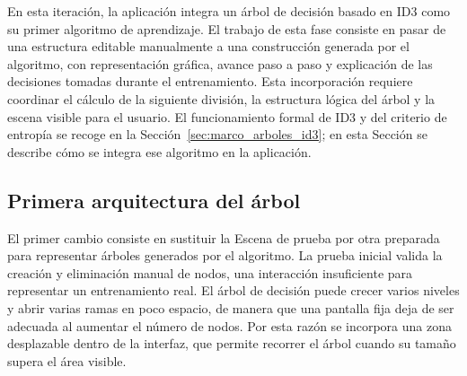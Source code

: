 En esta iteración, la aplicación integra un árbol de decisión basado en ID3 como su primer algoritmo de aprendizaje.
El trabajo de esta fase consiste en pasar de una estructura editable manualmente a una construcción generada por el algoritmo, con representación gráfica, avance paso a paso y explicación de las decisiones tomadas durante el entrenamiento.
Esta incorporación requiere coordinar el cálculo de la siguiente división, la estructura lógica del árbol y la \gls{escena} visible para el usuario.
El funcionamiento formal de ID3 y del criterio de entropía se recoge en la Sección~\ref{sec:marco_arboles_id3}; en esta Sección se describe cómo se integra ese algoritmo en la aplicación.


\subsection{Primera arquitectura del árbol}
\label{sec:primera_arquitectura_del_arbol}

El primer cambio consiste en sustituir la \gls{Escena} de prueba por otra preparada para representar árboles generados por el algoritmo.
La prueba inicial valida la creación y eliminación manual de \gls{nodo}s, una interacción insuficiente para representar un entrenamiento real.
El árbol de decisión puede crecer varios niveles y abrir varias ramas en poco espacio, de manera que una pantalla fija deja de ser adecuada al aumentar el número de \gls{nodo}s.
Por esta razón se incorpora una zona desplazable dentro de la interfaz, que permite recorrer el árbol cuando su tamaño supera el área visible.

